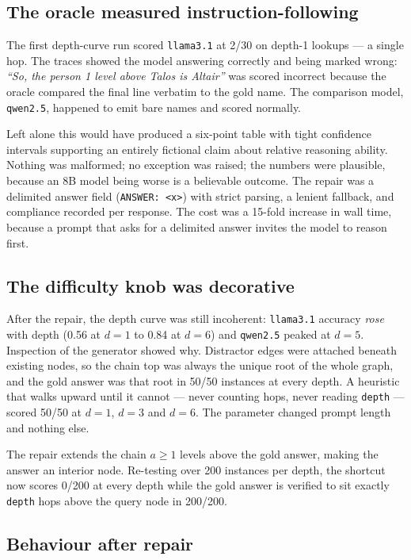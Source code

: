 \documentclass[10pt,twocolumn]{article}
\begin{document}
\subsection{The oracle measured instruction-following}

The first depth-curve run scored \texttt{llama3.1} at 2/30 on depth-1 lookups --- a single hop.
The traces showed the model answering correctly and being marked wrong:
\emph{``So, the person 1 level above Talos is Altair''} was scored incorrect because the oracle
compared the final line verbatim to the gold name. The comparison model, \texttt{qwen2.5}, happened
to emit bare names and scored normally.

Left alone this would have produced a six-point table with tight confidence intervals supporting an
entirely fictional claim about relative reasoning ability. Nothing was malformed; no exception was
raised; the numbers were plausible, because an 8B model being worse is a believable outcome. The
repair was a delimited answer field (\texttt{ANSWER: <x>}) with strict parsing, a lenient fallback,
and compliance recorded per response. The cost was a 15-fold increase in wall time, because a prompt
that asks for a delimited answer invites the model to reason first.

\subsection{The difficulty knob was decorative}

After the repair, the depth curve was still incoherent: \texttt{llama3.1} accuracy \emph{rose} with
depth (0.56 at $d{=}1$ to 0.84 at $d{=}6$) and \texttt{qwen2.5} peaked at $d{=}5$. Inspection of the
generator showed why. Distractor edges were attached beneath existing nodes, so the chain top was
always the unique root of the whole graph, and the gold answer was that root in 50/50 instances at
every depth. A heuristic that walks upward until it cannot --- never counting hops, never reading
\texttt{depth} --- scored 50/50 at $d{=}1$, $d{=}3$ and $d{=}6$. The parameter changed prompt length
and nothing else.

The repair extends the chain $a \geq 1$ levels above the gold answer, making the answer an interior
node. Re-testing over 200 instances per depth, the shortcut now scores 0/200 at every depth while
the gold answer is verified to sit exactly \texttt{depth} hops above the query node in 200/200.

\subsection{Behaviour after repair}
\end{document}
